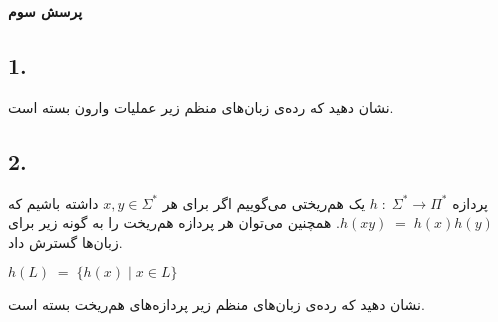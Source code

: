 \textbf{پرسش سوم}
\subsection*{1. }
نشان دهيد كه رده‌ی زبان‌های منظم زير عمليات وارون بسته است.
\subsection*{2. }
پردازه 
$h\;:\;\Sigma^* \rightarrow \Pi^*$
یک هم‌ریختی می‌گوییم اگر برای هر 
$x,y\in \Sigma^*$
داشته باشیم که
$h(xy)\;=\;h(x)h(y)$.\newline
همچنين می‌توان هر پردازه هم‌ريخت را به گونه زير برای زبان‌ها گسترش داد.
\begin{center}
    $h(L)\; = \; \{h(x)\; | \; x\in L\}$
\end{center}
نشان دهيد كه رده‌ی زبان‌های منظم زير پردازه‌های هم‌ريخت بسته است.